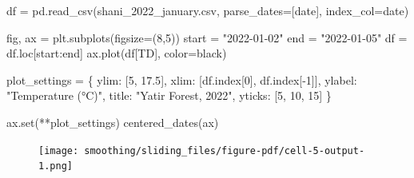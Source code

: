 \documentclass[
  letterpaper,
  DIV=11,
  numbers=noendperiod,
  oneside]{scrreprt}
\newenvironment{Shaded}{\begin{snugshade}}{\end{snugshade}}
\newcommand{\BuiltInTok}[1]{\textcolor[rgb]{0.00,0.23,0.31}{#1}}
\newcommand{\DecValTok}[1]{\textcolor[rgb]{0.68,0.00,0.00}{#1}}
\newcommand{\FloatTok}[1]{\textcolor[rgb]{0.68,0.00,0.00}{#1}}
\newcommand{\NormalTok}[1]{\textcolor[rgb]{0.00,0.23,0.31}{#1}}
\newcommand{\OperatorTok}[1]{\textcolor[rgb]{0.37,0.37,0.37}{#1}}
\newcommand{\StringTok}[1]{\textcolor[rgb]{0.13,0.47,0.30}{#1}}
\begin{document}
\begin{Shaded}
\begin{Highlighting}[]
\NormalTok{df }\OperatorTok{=}\NormalTok{ pd.read\_csv(}\StringTok{\textquotesingle{}shani\_2022\_january.csv\textquotesingle{}}\NormalTok{, parse\_dates}\OperatorTok{=}\NormalTok{[}\StringTok{\textquotesingle{}date\textquotesingle{}}\NormalTok{], index\_col}\OperatorTok{=}\StringTok{\textquotesingle{}date\textquotesingle{}}\NormalTok{)}
\end{Highlighting}
\end{Shaded}

\begin{Shaded}
\begin{Highlighting}[]
\NormalTok{fig, ax }\OperatorTok{=}\NormalTok{ plt.subplots(figsize}\OperatorTok{=}\NormalTok{(}\DecValTok{8}\NormalTok{,}\DecValTok{5}\NormalTok{))}
\NormalTok{start }\OperatorTok{=} \StringTok{"2022{-}01{-}02"}
\NormalTok{end }\OperatorTok{=} \StringTok{"2022{-}01{-}05"}
\NormalTok{df }\OperatorTok{=}\NormalTok{ df.loc[start:end]}
\NormalTok{ax.plot(df[}\StringTok{\textquotesingle{}TD\textquotesingle{}}\NormalTok{], color}\OperatorTok{=}\StringTok{\textquotesingle{}black\textquotesingle{}}\NormalTok{)}

\NormalTok{plot\_settings }\OperatorTok{=}\NormalTok{ \{}
    \StringTok{\textquotesingle{}ylim\textquotesingle{}}\NormalTok{: [}\DecValTok{5}\NormalTok{, }\FloatTok{17.5}\NormalTok{],}
    \StringTok{\textquotesingle{}xlim\textquotesingle{}}\NormalTok{: [df.index[}\DecValTok{0}\NormalTok{], df.index[}\OperatorTok{{-}}\DecValTok{1}\NormalTok{]],}
    \StringTok{\textquotesingle{}ylabel\textquotesingle{}}\NormalTok{: }\StringTok{"Temperature (°C)"}\NormalTok{,}
    \StringTok{\textquotesingle{}title\textquotesingle{}}\NormalTok{: }\StringTok{"Yatir Forest, 2022"}\NormalTok{,}
    \StringTok{\textquotesingle{}yticks\textquotesingle{}}\NormalTok{: [}\DecValTok{5}\NormalTok{, }\DecValTok{10}\NormalTok{, }\DecValTok{15}\NormalTok{]}
\NormalTok{\}}

\NormalTok{ax.}\BuiltInTok{set}\NormalTok{(}\OperatorTok{**}\NormalTok{plot\_settings)}
\NormalTok{centered\_dates(ax)}
\end{Highlighting}
\end{Shaded}

\begin{figure}[H]

{\centering \texttt{[image: smoothing/sliding\_files/figure-pdf/cell-5-output-1.png]}

}

\end{figure}
\end{document}
